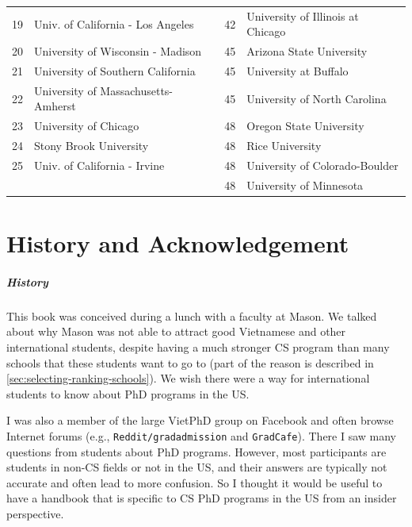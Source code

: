 \documentclass[oneside,11pt,dvipsnames]{book}
\newcommand{\red}[1]{{\color{red}{#1}}}
\begin{document}
\begin{table}
\begin{tabular}{rl|rl}
    19 & Univ. of California - Los Angeles  & 42& University of Illinois at Chicago  \\
    20 &  University of Wisconsin - Madison\red{$^*$}  &45& Arizona State University\red{$^*$} \\
    21 &  University of Southern California &45& University at Buffalo\red{$^*$} \\
    22 & University of Massachusetts-Amherst\red{$^*$} &45& University of North Carolina\red{$^*$} \\
    23 & University of Chicago &48& Oregon State University\red{$^*$}\\
    24 & Stony Brook University\red{$^*$} &48& Rice University\\
    25 &  Univ. of California - Irvine&48& University of Colorado-Boulder \\
    & &48& University of Minnesota\\ 
    \bottomrule
  \end{tabular}
\end{table}

\chapter{History and Acknowledgement}\label{sec:ack}
\paragraph{History} This book was conceived during a lunch with a faculty at Mason.  We talked about why Mason was not able to attract good Vietnamese and other international students, despite having a much stronger CS program than many schools that these students want to go to (part of the reason is described in \autoref{sec:selecting-ranking-schools}). We wish there were a way for international students to know about PhD programs in the US.

I was also a member of the large VietPhD group on Facebook and often browse Internet forums (e.g., \texttt{Reddit/gradadmission} and \texttt{GradCafe}). There I saw many questions from students about PhD programs.  However, most participants are students in non-CS fields or not in the US, and their answers are typically not accurate and often lead to more confusion. So I thought it would be useful to have a handbook that is specific to CS PhD programs in the US from an insider perspective.
\end{document}
